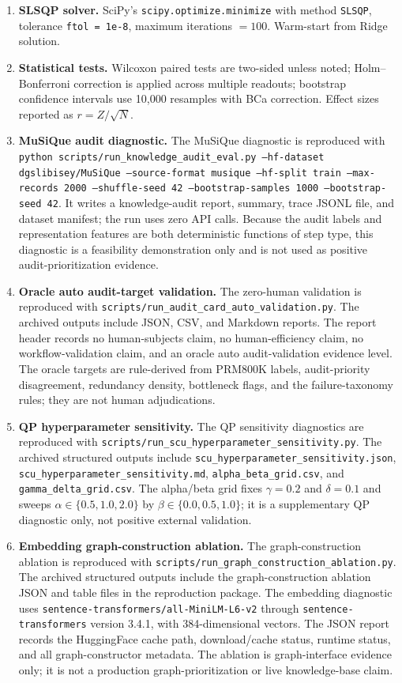 \documentclass[a4paper,fleqn]{cas-sc}
\begin{document}
\begin{enumerate}
\item \textbf{SLSQP solver.} SciPy's \texttt{scipy.optimize.minimize} with method \texttt{SLSQP}, tolerance \texttt{ftol = 1e-8}, maximum iterations $= 100$. Warm-start from Ridge solution.
\item \textbf{Statistical tests.} Wilcoxon paired tests are two-sided unless noted; Holm--Bonferroni correction is applied across multiple readouts; bootstrap confidence intervals use 10{,}000 resamples with BCa correction. Effect sizes reported as $r = Z/\sqrt{N}$.
\item \textbf{MuSiQue audit diagnostic.} The MuSiQue diagnostic is reproduced with \texttt{python scripts/run\_knowledge\_audit\_eval.py --hf-dataset dgslibisey/MuSiQue --source-format musique --hf-split train --max-records 2000 --shuffle-seed 42 --bootstrap-samples 1000 --bootstrap-seed 42}. It writes a knowledge-audit report, summary, trace JSONL file, and dataset manifest; the run uses zero API calls. Because the audit labels and representation features are both deterministic functions of step type, this diagnostic is a feasibility demonstration only and is not used as positive audit-prioritization evidence.
\item \textbf{Oracle auto audit-target validation.} The zero-human validation is reproduced with \texttt{scripts/run\_audit\_card\_auto\_validation.py}. The archived outputs include JSON, CSV, and Markdown reports. The report header records no human-subjects claim, no human-efficiency claim, no workflow-validation claim, and an oracle auto audit-validation evidence level. The oracle targets are rule-derived from PRM800K labels, audit-priority disagreement, redundancy density, bottleneck flags, and the failure-taxonomy rules; they are not human adjudications.
\item \textbf{QP hyperparameter sensitivity.} The QP sensitivity diagnostics are reproduced with \texttt{scripts/run\_scu\_hyperparameter\_sensitivity.py}. The archived structured outputs include \texttt{scu\_hyperparameter\_sensitivity.json}, \texttt{scu\_hyperparameter\_sensitivity.md}, \texttt{alpha\_beta\_grid.csv}, and \texttt{gamma\_delta\_grid.csv}. The alpha/beta grid fixes $\gamma=0.2$ and $\delta=0.1$ and sweeps $\alpha \in \{0.5,1.0,2.0\}$ by $\beta \in \{0.0,0.5,1.0\}$; it is a supplementary QP diagnostic only, not positive external validation.
\item \textbf{Embedding graph-construction ablation.} The graph-construction ablation is reproduced with \texttt{scripts/run\_graph\_construction\_ablation.py}. The archived structured outputs include the graph-construction ablation JSON and table files in the reproduction package. The embedding diagnostic uses \texttt{sentence-transformers/all-MiniLM-L6-v2} through \texttt{sentence-transformers} version 3.4.1, with 384-dimensional vectors. The JSON report records the HuggingFace cache path, download/cache status, runtime status, and all graph-constructor metadata. The ablation is graph-interface evidence only; it is not a production graph-prioritization or live knowledge-base claim.

\end{enumerate}
\end{document}
